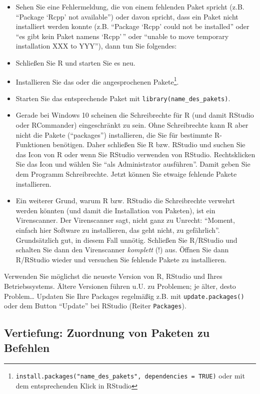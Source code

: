 \documentclass[12pt,ngerman,]{book}
\let\rmarkdownfootnote\footnote%
\def\footnote{\protect\rmarkdownfootnote}
\theoremstyle{definition}
\theoremstyle{definition}
\theoremstyle{remark}
\let\BeginKnitrBlock\begin \let\EndKnitrBlock\end
\begin{document}
\begin{itemize}
\item
  Sehen Sie eine Fehlermeldung, die von einem fehlenden Paket spricht
  (z.B. ``Package `Rcpp' not available'') oder davon spricht, dass ein
  Paket nicht installiert werden konnte (z.B. ``Package `Rcpp' could not
  be installed'' oder ``es gibt kein Paket namens `Rcpp'\,'' oder
  ``unable to move temporary installation XXX to YYY''), dann tun Sie
  folgendes:
\item
  Schließen Sie R und starten Sie es neu.
\item
  Installieren Sie das oder die angesprochenen Pakete\footnote{\texttt{install.packages("name\_des\_pakets",\ dependencies\ =\ TRUE)}
    oder mit dem entsprechenden Klick in RStudio}.
\item
  Starten Sie das entsprechende Paket mit
  \texttt{library(name\_des\_pakets)}.
\item
  Gerade bei Windows 10 scheinen die Schreibrechte für R (und damit
  RStudio oder RCommander) eingeschränkt zu sein. Ohne Schreibrechte
  kann R aber nicht die Pakete (``packages'') installieren, die Sie für
  bestimmte R-Funktionen benötigen. Daher schließen Sie R bzw. RStudio
  und suchen Sie das Icon von R oder wenn Sie RStudio verwenden von
  RStudio. Rechtsklicken Sie das Icon und wählen Sie ``als Administrator
  ausführen''. Damit geben Sie dem Programm Schreibrechte. Jetzt können
  Sie etwaige fehlende Pakete installieren.
\item
  Ein weiterer Grund, warum R bzw. RStudio die Schreibrechte verwehrt
  werden könnten (und damit die Installation von Paketen), ist ein
  Virenscanner. Der Virenscanner sagt, nicht ganz zu Unrecht: ``Moment,
  einfach hier Software zu installieren, das geht nicht, zu
  gefährlich''. Grundsätzlich gut, in diesem Fall unnötig. Schließen Sie
  R/RStudio und schalten Sie dann den Virenscanner \emph{komplett} (!)
  aus. Öffnen Sie dann R/RStudio wieder und versuchen Sie fehlende
  Pakete zu installieren.
\end{itemize}

\BeginKnitrBlock{rmdcaution}
Verwenden Sie möglichst die neueste Version von R, RStudio und Ihres
Betriebssystems. Ältere Versionen führen u.U. zu Problemen; je älter,
desto Problem\ldots{} Updaten Sie Ihre Packages regelmäßig z.B. mit
\texttt{update.packages()} oder dem Button ``Update'' bei RStudio
(Reiter \texttt{Packages}).
\EndKnitrBlock{rmdcaution}

\subsection{Vertiefung: Zuordnung von Paketen zu
Befehlen}\label{funs-pckgs}
\end{document}
